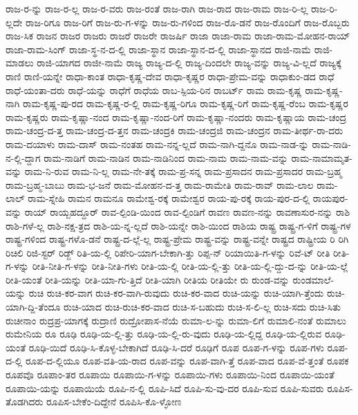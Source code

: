 {ರಾಜ-ರ-ನ್ನು
ರಾಜ-ರ-ಲ್ಲ
ರಾಜ-ರ-ವರು
ರಾಜ-ರಂತೆ
ರಾಜ-ರಾಗಿ
ರಾಜ-ರಾದ
ರಾಜ-ರಾಮ
ರಾಜ-ರಿ-ಲ್ಲ
ರಾಜ-ರಿ-ಲ್ಲದೇ
ರಾಜ-ರಿಗೂ
ರಾಜ-ರಿಗೆ
ರಾಜ-ರು-ಗ-ಳನ್ನು
ರಾಜ-ರು-ಗಳಿಂದ
ರಾಜ-ರೊ-ಡನೆ
ರಾಜ-ರೊಂದಿಗೆ
ರಾಜ-ರೊಬ್ಬರು
ರಾಜ-ಸಿಕ
ರಾಜನ
ರಾಜರ
ರಾಜರು
ರಾಜರೆ
ರಾಜರೇ
ರಾಜರ್ಷಿ
ರಾಜಾ
ರಾಜಾ-ರಾಮ
ರಾಜಾ-ರಾಮ-ಮೋಹನ-ರಾಯ್
ರಾಜಾ-ರಾಮ-ಸಿಂಗ್
ರಾಜಾ-ಸ್ಥ-ನ-ದ-ಲ್ಲಿ
ರಾಜಾ-ಸ್ಥಾನ
ರಾಜಾ-ಸ್ಥಾನ-ದ-ಲ್ಲಿ
ರಾಜಾ-ಸ್ಥಾನದ
ರಾಜಿ-ನಾಮೆ
ರಾಜಿ-ಮಾಡಲು
ರಾಜಿ-ಯಾಗದ
ರಾಜೀ-ನಾಮೆ
ರಾಜ್ಯ
ರಾಜ್ಯ-ದ-ಲ್ಲಿ
ರಾಜ್ಯ-ದಿಂದಲೇ
ರಾಜ್ಯ-ವನ್ನು
ರಾಜ್ಯ-ವಿ-ಲ್ಲದೆ
ರಾಜ್ಯಕ್ಕೆ
ರಾಣಿ
ರಾಣಿ-ಯನ್ನೇ
ರಾಧಾ-ಕಾಂತ
ರಾಧಾ-ಕೃಷ್ಣ-ದೇವ
ರಾಧಾ-ಕೃಷ್ಣರ
ರಾಧಾ-ಪ್ರೇಮ-ವನ್ನು
ರಾಧಾಕುಂ-ಡದ
ರಾಧೆ
ರಾಧೆ-ಯಂತಾ-ದರು
ರಾಧೆ-ಯನ್ನು
ರಾಧೆಗೆ
ರಾಧೆಯ
ರಾಬ-ಸ್ಪಿಯ-ರಿನ
ರಾಬರ್ಟ್
ರಾಮ
ರಾಮ-ಕೃಷ್ಣ
ರಾಮ-ಕೃಷ್ಣ-ನಾಗಿ
ರಾಮ-ಕೃಷ್ಣ-ಪು-ರದ
ರಾಮ-ಕೃಷ್ಣ-ರ-ಲ್ಲಿ
ರಾಮ-ಕೃಷ್ಣ-ರಿಗೂ
ರಾಮ-ಕೃಷ್ಣ-ರಿಗೆ
ರಾಮ-ಕೃಷ್ಣ-ರೆಂಬ
ರಾಮ-ಕೃಷ್ಣರ
ರಾಮ-ಕೃಷ್ಣರು
ರಾಮ-ಕೃಷ್ಣಾ-ನಂದ
ರಾಮ-ಕೃಷ್ಣಾ-ನಂದ-ರಿಗೆ
ರಾಮ-ಕೃಷ್ಣಾ-ನಂದರು
ರಾಮ-ಕೃಷ್ಣಾಯ
ರಾಮ-ಚಂದ್ರ
ರಾಮ-ಚಂದ್ರ-ದ-ತ್ತ
ರಾಮ-ಚಂದ್ರ-ದ-ತ್ತನ
ರಾಮ-ಚಂದ್ರಕಿ
ರಾಮ-ಚಂದ್ರಜಿ
ರಾಮ-ಚಂದ್ರನ
ರಾಮ-ತೀರ್ಥ-ರಾ-ದರು
ರಾಮ-ದಯಾಳು
ರಾಮ-ದಾಸ್
ರಾಮ-ನಂತಹ
ರಾಮ-ನನ್ನ-ಲ್ಲದೆ
ರಾಮ-ನಾಗಿ-ದ್ದನೊ
ರಾಮ-ನಾಡ-ನ್ನು
ರಾಮ-ನಾಡಿ-ನ-ಲ್ಲಿ-ದ್ದಾಗ
ರಾಮ-ನಾಡಿಗೆ
ರಾಮ-ನಾಡಿನ
ರಾಮ-ನಾಡಿನಿಂದ
ರಾಮ-ನಾಮ
ರಾಮ-ನಾಮ-ವನ್ನು
ರಾಮ-ನಾಮಾಮೃತ-ವನ್ನು
ರಾಮ-ನಿ-ರುವ
ರಾಮ-ನಿ-ಲ್ಲ
ರಾಮ-ನೇ-ತಕ್ಕೆ
ರಾಮ-ಪ್ರ-ಸನ್ನ
ರಾಮ-ಪ್ರಸಾದನ
ರಾಮ-ಪ್ರಸಾದರ
ರಾಮ-ಬ್ರಹ್ಮ
ರಾಮ-ಬ್ರಹ್ಮ-ಬಾಬು
ರಾಮ-ಭ-ಜನೆ
ರಾಮ-ಮೋಹನ-ದ-ತ್ತ
ರಾಮ-ರಾಮೇತಿ
ರಾಮ-ರಾವ್
ರಾಮ-ಲಾಲ
ರಾಮ-ಲಾಲ್
ರಾಮ-ಸ್ನೇಹಿ
ರಾಮನ
ರಾಮನೂ
ರಾಮೇಶ್ವ-ರಕ್ಕೆ
ರಾಮೇಶ್ವರ
ರಾಯ-ಪು-ರಕ್ಕೆ
ರಾಯ-ಪುರ-ದ-ಲ್ಲಿ
ರಾಯಪುರ-ವನ್ನು
ರಾಯ್
ರಾಯ್ಬಹದ್ದೂರ್
ರಾವ-ಲ್ಪಿಂಡಿ-ಯಿಂದ
ರಾವ-ಲ್ಪಿಂಡಿಗೆ
ರಾವಣ
ರಾವಣ-ನನ್ನು
ರಾವಣಾಸುರ-ನನ್ನು
ರಾಶಿ
ರಾಶಿ-ಗಳೆ-ಲ್ಲ
ರಾಶಿ-ನಕ್ಷ-ತ್ರದ
ರಾಶಿ-ಯ-ನ್ನ-ಲ್ಲದೆ
ರಾಶಿ-ಯನ್ನೇ
ರಾಶಿ-ಯಿಂದ
ರಾಶಿಯ
ರಾಷ್ಟ್ರ
ರಾಷ್ಟ್ರ-ಗ-ಳಿಗೆ
ರಾಷ್ಟ್ರ-ಗಳ
ರಾಷ್ಟ್ರ-ಗಳಿಂದ
ರಾಷ್ಟ್ರ-ಗಳೊ-ಡನೆ
ರಾಷ್ಟ್ರ-ದ-ಲ್ಲೆ-ಲ್ಲ
ರಾಷ್ಟ್ರ-ಪ್ರೇಮ
ರಾಷ್ಟ್ರ-ವನ್ನು
ರಾಷ್ಟ್ರ-ವನ್ನೇ
ರಾಷ್ಟ್ರದ
ರಾಷ್ಟ್ರೀಯ
ರಿ
ರಿಗಿ
ರಿಚಿಲಿ
ರಿಜಿ-ಸ್ಟರ್
ರಿಡ್ಜ್
ರಿತಿ-ಯ-ಲ್ಲಿ
ರಿಪೇರಿ-ಯಾಗ-ಬೇಕಾಗಿ-ತ್ತು
ರಿಪ್ಪ-ನ್
ರಿಯಾಯಿತಿ-ಗ-ಳನ್ನು
ರಿವೆ-ಟ್
ರೀತಿ
ರೀತಿ-ಗ-ಳನ್ನು
ರೀತಿ-ನೀತಿ-ಗ-ಳನ್ನು
ರೀತಿ-ನೀತಿ-ಗಳು
ರೀತಿ-ಯ-ಲ್ಲಿ
ರೀತಿ-ಯ-ಲ್ಲಿ-ತ್ತು
ರೀತಿ-ಯ-ಲ್ಲಿ-ದ್ದು-ದ-ನ್ನು
ರೀತಿ-ಯ-ಲ್ಲೆ
ರೀತಿ-ಯಂತೆ
ರೀತಿ-ಯನ್ನು
ರೀತಿ-ಯಾ-ಗು-ತ್ತಿದೆ
ರೀತಿ-ಯಾಗಿ
ರೀತಿಯ
ರೀತಿಯೇ
ರು
ರುಂಡ-ವನ್ನು
ರುಂಡಮಾಲೆ-ಯನ್ನು
ರುಚಿ
ರುಚಿ-ಕರ-ವಾಗ
ರುಚಿ-ಕರ-ವಾಗಿ-ರುವುದು
ರುಚಿ-ಕರ-ವಾದ
ರುಚಿ-ಯನ್ನು
ರುಚಿ-ಯಾಗಿ-ತ್ತೆಂದು
ರುಚಿ-ಯಾಗಿ-ದ್ದಿ-ತೆಂದೂ
ರುಚಿ-ಯಾದ
ರುಚಿ-ರುಚಿ-ಕರ-ವಾದ
ರುಚಿ-ಸ-ಬಹುದು
ರುಚಿ-ಸ-ಲಿ-ಲ್ಲ
ರುಚಿ-ಸದು
ರುಚಿ-ಸಿತು
ರುಚೀನಾಂ
ರುದ್ರಪ್ರ-ಯಾಗಕ್ಕೆ
ರುದ್ರಾಣಿ
ರುದ್ರೋಪಾಸ-ನೆಯೆ
ರುಮಾ-ಲ-ನ್ನು
ರುಮಾ-ಲಿಗೆ
ರುಮಾಲಿ-ನಂತೆ
ರುಮಾಲು
ರುಮೇನಿಯ
ರೂ
ರೂಢಿ
ರೂಢಿ-ಯ-ಲ್ಲಿ-ತ್ತು
ರೂಢಿ-ಯ-ಲ್ಲಿ-ರು-ವುದು
ರೂಢಿ-ಯ-ಲ್ಲಿದ್ದ
ರೂಢಿ-ಯ-ಲ್ಲಿರುವ
ರೂಢಿ-ಯಂತೆ
ರೂಢಿ-ಯಿದೆ
ರೂಢಿ-ಸಿ-ಕೊಳ್ಳ-ಬೇಕಾಗಿದೆ
ರೂಢಿ-ಸಿ-ದರೆ
ರೂಢಿಗೆ
ರೂಪ
ರೂಪ-ಗ-ಳನ್ನು
ರೂಪ-ಗಳು
ರೂಪ-ದ-ಲ್ಲಿ
ರೂಪ-ದ-ಲ್ಲಿಯೂ
ರೂಪ-ವತಿ-ಯ-ರಾದ
ರೂಪ-ವನ್ನು
ರೂಪ-ವಾಗಿ-ತ್ತೆ
ರೂಪ-ವಾದ
ರೂಪ-ವೆ-ತ್ತಂತೆ
ರೂಪಕ
ರೂಪವೊ
ರೂಪಾಂ-ತರ
ರೂಪಾಯಿ
ರೂಪಾಯಿ-ಗ-ಳನ್ನು
ರೂಪಾಯಿ-ಗಳು
ರೂಪಾಯಿ-ನಿಂದ
ರೂಪಾಯಿ-ಯಂತೆ
ರೂಪಾಯಿ-ಯನ್ನು
ರೂಪಾಯಿಯೆ
ರೂಪಿ-ನ-ಲ್ಲಿ
ರೂಪಿ-ಸಿದೆ
ರೂಪಿ-ಸು-ವು-ದರ
ರೂಪಿ-ಸುವ
ರೂಪಿ-ಸುವರು
ರೂಪಿಸ-ತೊಡಗಿದರು
ರೂಪಿಸ-ಬೇಕೆಂ-ದಿದ್ದೇನೆ
ರೂಪಿಸಿ-ಕೊ-ಳ್ಳೋಣ
}
